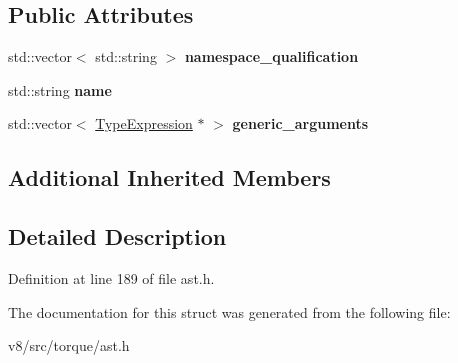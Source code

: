 \subsection*{Public Attributes}
\begin{DoxyCompactItemize}
\item 
\mbox{\label{structv8_1_1internal_1_1torque_1_1IdentifierExpression_a9183c9cb612fc720700e0142d6ef08ef}} 
std\+::vector$<$ std\+::string $>$ {\bfseries namespace\+\_\+qualification}
\item 
\mbox{\label{structv8_1_1internal_1_1torque_1_1IdentifierExpression_a808015e3c3caace9333e74bbc14ff13d}} 
std\+::string {\bfseries name}
\item 
\mbox{\label{structv8_1_1internal_1_1torque_1_1IdentifierExpression_a8fd25f9f9bcb67b4bbc8e8d38532ec5b}} 
std\+::vector$<$ \mbox{\hyperlink{structv8_1_1internal_1_1torque_1_1TypeExpression}{Type\+Expression}} $\ast$ $>$ {\bfseries generic\+\_\+arguments}
\end{DoxyCompactItemize}
\subsection*{Additional Inherited Members}


\subsection{Detailed Description}


Definition at line 189 of file ast.\+h.



The documentation for this struct was generated from the following file\+:\begin{DoxyCompactItemize}
\item 
v8/src/torque/ast.\+h\end{DoxyCompactItemize}
